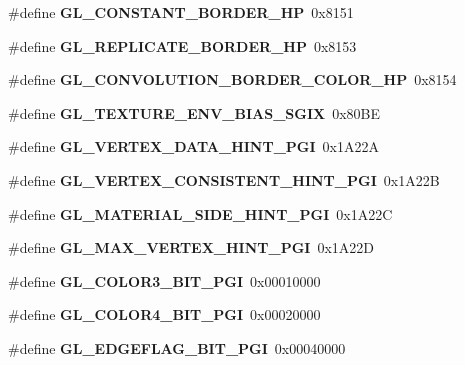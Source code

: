 \begin{DoxyCompactItemize}
\item 
\#define {\bfseries G\+L\+\_\+\+C\+O\+N\+S\+T\+A\+N\+T\+\_\+\+B\+O\+R\+D\+E\+R\+\_\+\+H\+P}~0x8151\label{_s_d_l__opengl_8h_a0ef7929f35e85429fe38fc141d8a4d58}

\item 
\#define {\bfseries G\+L\+\_\+\+R\+E\+P\+L\+I\+C\+A\+T\+E\+\_\+\+B\+O\+R\+D\+E\+R\+\_\+\+H\+P}~0x8153\label{_s_d_l__opengl_8h_abbd1632c0db369fa580b8bb68e756c80}

\item 
\#define {\bfseries G\+L\+\_\+\+C\+O\+N\+V\+O\+L\+U\+T\+I\+O\+N\+\_\+\+B\+O\+R\+D\+E\+R\+\_\+\+C\+O\+L\+O\+R\+\_\+\+H\+P}~0x8154\label{_s_d_l__opengl_8h_ad3afce16af1b58bf9b60483b1b8d544f}

\item 
\#define {\bfseries G\+L\+\_\+\+T\+E\+X\+T\+U\+R\+E\+\_\+\+E\+N\+V\+\_\+\+B\+I\+A\+S\+\_\+\+S\+G\+I\+X}~0x80\+B\+E\label{_s_d_l__opengl_8h_a3eff01c4519e06fde9a8e57f96e0d14b}

\item 
\#define {\bfseries G\+L\+\_\+\+V\+E\+R\+T\+E\+X\+\_\+\+D\+A\+T\+A\+\_\+\+H\+I\+N\+T\+\_\+\+P\+G\+I}~0x1\+A22\+A\label{_s_d_l__opengl_8h_a447f7bb0d896b42ee3e1c9460ea52b2d}

\item 
\#define {\bfseries G\+L\+\_\+\+V\+E\+R\+T\+E\+X\+\_\+\+C\+O\+N\+S\+I\+S\+T\+E\+N\+T\+\_\+\+H\+I\+N\+T\+\_\+\+P\+G\+I}~0x1\+A22\+B\label{_s_d_l__opengl_8h_a157b78654bfcae5de6324740083fd6ef}

\item 
\#define {\bfseries G\+L\+\_\+\+M\+A\+T\+E\+R\+I\+A\+L\+\_\+\+S\+I\+D\+E\+\_\+\+H\+I\+N\+T\+\_\+\+P\+G\+I}~0x1\+A22\+C\label{_s_d_l__opengl_8h_a9efaf99547d4a3959209d17d0f4bb20a}

\item 
\#define {\bfseries G\+L\+\_\+\+M\+A\+X\+\_\+\+V\+E\+R\+T\+E\+X\+\_\+\+H\+I\+N\+T\+\_\+\+P\+G\+I}~0x1\+A22\+D\label{_s_d_l__opengl_8h_a84d0be5daf41950a078fd5a1dc632076}

\item 
\#define {\bfseries G\+L\+\_\+\+C\+O\+L\+O\+R3\+\_\+\+B\+I\+T\+\_\+\+P\+G\+I}~0x00010000\label{_s_d_l__opengl_8h_aa03dee77235d44438de5624dfd53c2b0}

\item 
\#define {\bfseries G\+L\+\_\+\+C\+O\+L\+O\+R4\+\_\+\+B\+I\+T\+\_\+\+P\+G\+I}~0x00020000\label{_s_d_l__opengl_8h_ace9811ca67aa25068b602bd63becdedc}

\item 
\#define {\bfseries G\+L\+\_\+\+E\+D\+G\+E\+F\+L\+A\+G\+\_\+\+B\+I\+T\+\_\+\+P\+G\+I}~0x00040000\label{_s_d_l__opengl_8h_a7cf113ae6ac0e2f2cd19ba18a64d03ea}


\end{DoxyCompactItemize}
